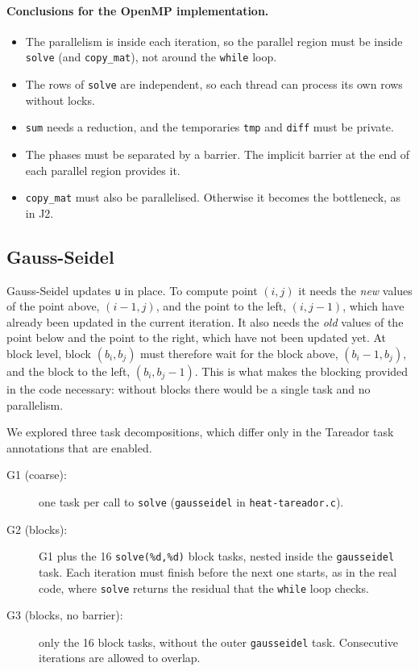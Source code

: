 \documentclass[11pt,a4paper]{article}
\begin{document}
\paragraph{Conclusions for the OpenMP implementation.}
\begin{itemize}
  \item The parallelism is inside each iteration, so the parallel region must be inside \texttt{solve} (and \texttt{copy\_mat}), not around the \texttt{while} loop.
  \item The rows of \texttt{solve} are independent, so each thread can process its own rows without locks.
  \item \texttt{sum} needs a reduction, and the temporaries \texttt{tmp} and \texttt{diff} must be private.
  \item The phases must be separated by a barrier. The implicit barrier at the end of each parallel region provides it.
  \item \texttt{copy\_mat} must also be parallelised. Otherwise it becomes the bottleneck, as in J2.
\end{itemize}

\subsection{Gauss-Seidel}

Gauss-Seidel updates \texttt{u} in place. To compute point $(i,j)$ it needs the \emph{new} values of the point above, $(i-1,j)$, and the point to the left, $(i,j-1)$, which have already been updated in the current iteration. It also needs the \emph{old} values of the point below and the point to the right, which have not been updated yet. At block level, block $(b_i,b_j)$ must therefore wait for the block above, $(b_i-1,b_j)$, and the block to the left, $(b_i,b_j-1)$. This is what makes the blocking provided in the code necessary: without blocks there would be a single task and no parallelism.

We explored three task decompositions, which differ only in the Tareador task annotations that are enabled.
\begin{description}
  \item[G1 (coarse):] one task per call to \texttt{solve} (\texttt{gausseidel} in \texttt{heat-tareador.c}).
  \item[G2 (blocks):] G1 plus the 16 \texttt{solve(\%d,\%d)} block tasks, nested inside the \texttt{gausseidel} task. Each iteration must finish before the next one starts, as in the real code, where \texttt{solve} returns the residual that the \texttt{while} loop checks.
  \item[G3 (blocks, no barrier):] only the 16 block tasks, without the outer \texttt{gausseidel} task. Consecutive iterations are allowed to overlap.
\end{description}
\end{document}
